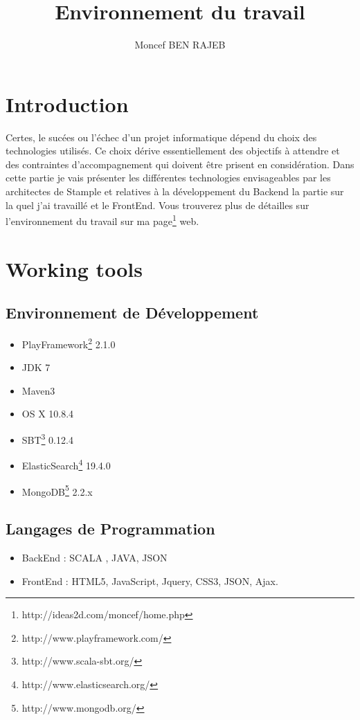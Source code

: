 \documentclass[11pt]{article} %
\title{Environnement du travail}
\author{Moncef BEN RAJEB}
\begin{document}
\maketitle
\section{Introduction}
Certes, le sucées ou l'échec d'un projet informatique dépend du choix des technologies utilisés.
Ce choix dérive essentiellement des objectifs à attendre et des contraintes d'accompagnement qui doivent être prisent en considération.
Dans cette partie je vais présenter les différentes technologies envisageables par les architectes de Stample 
et relatives à la développement du Backend la partie sur la quel j'ai travaillé et le FrontEnd.
Vous trouverez plus de détailles sur l'environnement du travail sur ma page\footnote{http://ideas2d.com/moncef/home.php} web.
\section{Working tools}
\subsection{Environnement de Développement}
\begin{itemize}
\item PlayFramework\footnote{http://www.playframework.com/} 2.1.0
\item JDK 7
\item Maven3
\item OS X 10.8.4
\item SBT\footnote{http://www.scala-sbt.org/} 0.12.4
\item ElasticSearch\footnote{http://www.elasticsearch.org/} 19.4.0
\item MongoDB\footnote{http://www.mongodb.org/} 2.2.x

\end{itemize}

\subsection{Langages de Programmation}
\begin{itemize}

\item BackEnd : SCALA , JAVA, JSON
\item FrontEnd : HTML5, JavaScript, Jquery, CSS3, JSON, Ajax. 

\end{itemize}
\end{document}
